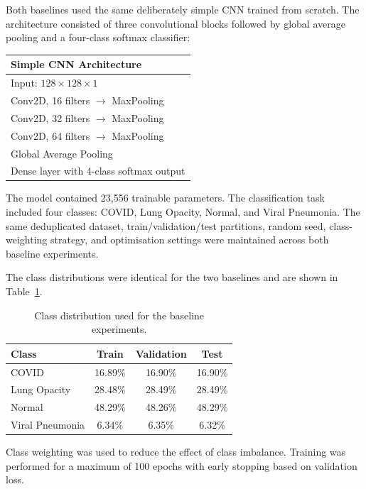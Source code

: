 Both baselines used the same deliberately simple CNN trained from scratch.
The architecture consisted of three convolutional blocks followed by global
average pooling and a four-class softmax classifier:

\begin{center}
\begin{tabular}{l}
\toprule
\textbf{Simple CNN Architecture} \\
\midrule
Input: $128 \times 128 \times 1$ \\
Conv2D, 16 filters $\rightarrow$ MaxPooling \\
Conv2D, 32 filters $\rightarrow$ MaxPooling \\
Conv2D, 64 filters $\rightarrow$ MaxPooling \\
Global Average Pooling \\
Dense layer with 4-class softmax output \\
\bottomrule
\end{tabular}
\end{center}

The model contained 23,556 trainable parameters. The classification task
included four classes: COVID, Lung Opacity, Normal, and Viral Pneumonia.
The same deduplicated dataset, train/validation/test partitions, random seed,
class-weighting strategy, and optimisation settings were maintained across
both baseline experiments.

The class distributions were identical for the two baselines and are shown in
Table~\ref{tab:baseline_class_distribution}.

\begin{table}[H]
\centering
\caption{Class distribution used for the baseline experiments.}
\label{tab:baseline_class_distribution}
\begin{tabular}{lccc}
\toprule
\textbf{Class} & \textbf{Train} & \textbf{Validation} & \textbf{Test} \\
\midrule
COVID            & 16.89\% & 16.90\% & 16.90\% \\
Lung Opacity     & 28.48\% & 28.49\% & 28.49\% \\
Normal           & 48.29\% & 48.26\% & 48.29\% \\
Viral Pneumonia  &  6.34\% &  6.35\% &  6.32\% \\
\bottomrule
\end{tabular}
\end{table}

Class weighting was used to reduce the effect of class imbalance. Training was
performed for a maximum of 100 epochs with early stopping based on validation
loss.

